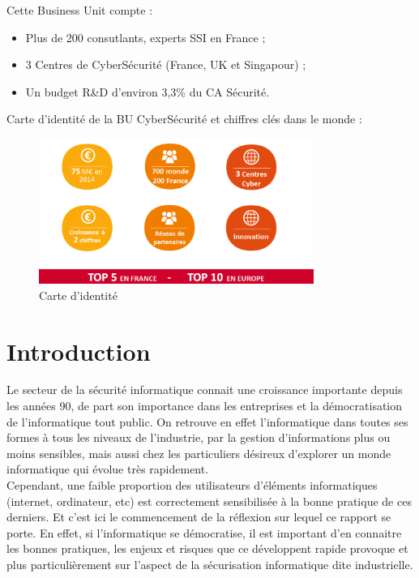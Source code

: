\documentclass[a4paper]{memoir}
\begin{document}
Cette Business Unit compte : 

\begin{itemize}
\item Plus de 200 consutlants, experts SSI en France ;
\item 3 Centres de CyberSécurité (France, UK et Singapour) ;
\item Un budget R\&D d'environ 3,3\% du CA Sécurité.
\end{itemize}

Carte d’identité de la BU CyberSécurité et chiffres clés dans le monde :

\begin{figure}[!ht]
    \center
    \includegraphics[width=0.8\textwidth]{./images/sopra5.png}
    \caption{Carte d'identité}
    \label{ID}
\end{figure}

\cleardoublepage
\tableofcontents*


\mainmatter%


\chapter*{Introduction}

Le secteur de la sécurité informatique connait une croissance importante depuis les années 90, de part son importance dans les entreprises et la démocratisation de l'informatique tout public. On retrouve en effet l'informatique dans toutes ses formes à tous les niveaux de l'industrie, par la gestion d'informations plus ou moins sensibles, mais aussi chez les particuliers désireux d'explorer un monde informatique qui évolue très rapidement.\\

Cependant, une faible proportion des utilisateurs d'éléments informatiques (internet, ordinateur, etc) est correctement sensibilisée à la bonne pratique de ces derniers. Et c'est ici le commencement de la réflexion sur lequel ce rapport se porte. En effet, si l'informatique se démocratise, il est important d'en connaitre les bonnes pratiques, les enjeux et risques que ce développent rapide provoque et plus particulièrement sur l'aspect de la sécurisation informatique dite industrielle.
\end{document}
